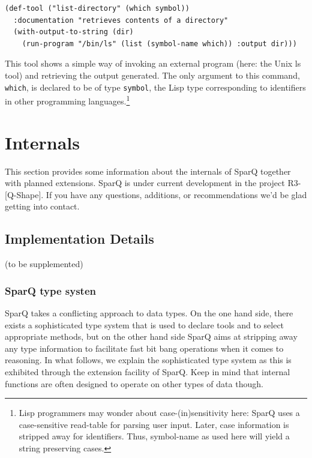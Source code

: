 \documentclass[headsepline]{scrreprt}
\theoremstyle{definition}
\newcommand{\qshape}{R3-[Q-Shape]}
\newcommand{\engine}{SparQ}
\begin{document}
\begin{lstlisting}
(def-tool ("list-directory" (which symbol))
  :documentation "retrieves contents of a directory"
  (with-output-to-string (dir) 
    (run-program "/bin/ls" (list (symbol-name which)) :output dir)))
\end{lstlisting}

This tool shows a simple way of invoking an external program (here: the Unix ls tool) and retrieving the output generated. 
The only argument to this command, {\tt which}, is declared to be of type {\tt symbol}, the Lisp type corresponding to identifiers in other programming languages.\footnote{Lisp programmers may wonder about case-(in)sensitivity here: \engine{} uses 
a case-sensitive read-table for parsing user input. Later, case information is stripped away for identifiers. Thus, symbol-name as used here will yield a string preserving cases.}




\chapter{Internals}\label{sec:internals}

This section provides some information about the internals of \engine{} together
with planned extensions. \engine{} is under current development in the project
\qshape . If you have any questions, additions, or recommendations we'd be glad
getting into contact.

\section{Implementation Details}

(to be supplemented)

\subsection{\engine{} type systen}
\engine{} takes a conflicting approach to data types. On the one hand side, there exists a sophisticated type system that is used to declare tools and to select appropriate methods, but on the other hand side \engine{} aims at stripping away any type information to facilitate fast bit bang operations when it comes to reasoning. In what follows, we explain the sophisticated type system as this is exhibited through the extension facility of \engine{}. Keep in mind that internal functions are often designed to operate on other types of data though.
\end{document}
